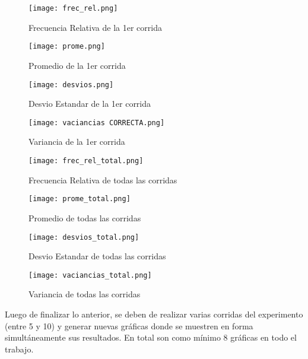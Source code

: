\documentclass[onecolumn]{article}
\begin{document}
\begin{figure}[h!]
  \centering
  \texttt{[image: frec\_rel.png]}
  \caption{Frecuencia Relativa de la 1er corrida} 
  \label{fig: imagen1}
\end{figure}
\FloatBarrier
\begin{figure}[h!]
  \centering
  \texttt{[image: prome.png]}
  \caption{Promedio de la 1er corrida}
  \label{fig: imagen2}
\end{figure}
\FloatBarrier
\begin{figure}[h!]
  \centering
  \texttt{[image: desvios.png]}
  \caption{Desvio Estandar de la 1er corrida} 
  \label{fig: imagen3}
\end{figure}
\FloatBarrier
\begin{figure}[h!]
  \centering
  \texttt{[image: vaciancias CORRECTA.png]}
  \caption{Variancia de la 1er corrida} 
  \label{fig: imagen4}
\end{figure}
\FloatBarrier
\begin{figure}[h!]
  \centering
  \texttt{[image: frec\_rel\_total.png]}
  \caption{Frecuencia Relativa de todas las corridas} 
  \label{fig: imagen5}
\end{figure}
\FloatBarrier
\begin{figure}[h!]
  \centering
  \texttt{[image: prome\_total.png]}
  \caption{Promedio de todas las corridas} 
  \label{fig: imagen6}
\end{figure}
\FloatBarrier
\begin{figure}[h!]
  \centering
  \texttt{[image: desvios\_total.png]}
  \caption{Desvio Estandar de todas las corridas} 
  \label{fig: imagen7}
\end{figure}
\FloatBarrier
\begin{figure}[h!]
  \centering
  \texttt{[image: vaciancias\_total.png]}
  \caption{Variancia de todas las corridas} 
  \label{fig: imagen8}
\end{figure}
\FloatBarrier


\normalsize Luego de finalizar lo anterior, se deben de realizar varias corridas del experimento (entre 5 y 10) y generar nuevas gráficas donde se muestren en forma simultáneamente sus resultados. En total son como mínimo 8 gráficas en todo el trabajo. 
\end{document}
